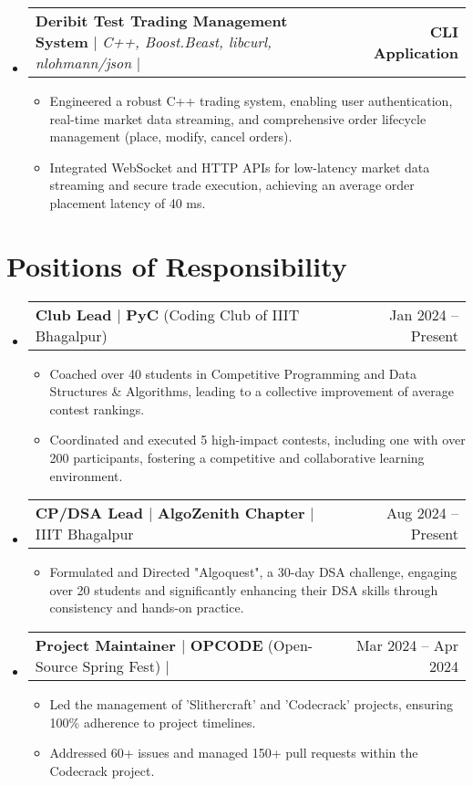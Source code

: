 \documentclass[letterpaper,11pt]{article}
\makeatletter
\newcommand{\resumePOR}[3]{
\vspace{0.5mm}\item
    \begin{tabular*}{0.97\textwidth}[t]{l@{\extracolsep{\fill}}r}
        \textbf{#1}\hspace{0.3mm}#2 & \small{#3} 
    \end{tabular*}
    \vspace{-3mm}
}
\newcommand{\resumeProjectHeading}[2]{
    \item
    \begin{tabular*}{1.001\textwidth}{l@{\extracolsep{\fill}}r}
      \small#1 & \textbf{\small #2}\\
    \end{tabular*}\vspace{-7pt}
}
\newcommand{\resumeSubHeadingListStart}{\begin{itemize}[leftmargin=0.0in, label={}]}
\newcommand{\resumeSubHeadingListEnd}{\end{itemize}}
\newcommand{\resumeItemListStart}{\begin{itemize}}
\newcommand{\resumeItemListEnd}{\end{itemize}\vspace{-15pt}}
\makeatother
\begin{document}
    \vspace{-8pt}
    \resumeSubHeadingListStart
    \resumeProjectHeading
      {\textbf{\large Deribit Test Trading Management System} $|$ \emph{C++, Boost.Beast, libcurl, nlohmann/json} $|$ \emph{\color{Blue} \href{https://github.com/sanghaibiraj/DeribitTest_TradeManagementSystem}\faGithub{}}}{CLI Application}
      \vspace{-16pt}
      \resumeItemListStart
        \item Engineered a robust C++ trading system, enabling user authentication, real-time market data streaming, and comprehensive order lifecycle management (place, modify, cancel orders). 
        \vspace{-4pt}
        \item Integrated WebSocket and HTTP APIs for low-latency market data streaming and secure trade execution, achieving an average order placement latency of 40 ms.
      \resumeItemListEnd
    \vspace{-10pt}
\resumeSubHeadingListEnd

\vspace{8pt}

\section{\textbf{Positions of Responsibility}}
\resumeSubHeadingListStart
\resumePOR{Club Lead $|$ }{\textbf{PyC }(Coding Club of IIIT Bhagalpur)}{Jan 2024 -- Present}
    \resumeItemListStart
        \item Coached over 40 students in Competitive Programming and Data Structures \& Algorithms, leading to a collective improvement of average contest rankings.
        \vspace{-4pt}
        \item Coordinated and executed 5 high-impact contests, including one with over 200 participants, fostering a competitive and collaborative learning environment.
    \resumeItemListEnd
\vspace{4pt}
\resumePOR{CP/DSA Lead $|$ }{\textbf{AlgoZenith Chapter} $|$ IIIT Bhagalpur}{Aug 2024 -- Present}
    \resumeItemListStart
        \item Formulated and Directed "Algoquest", a 30-day DSA challenge, engaging over 20 students and significantly enhancing their DSA skills through consistency and hands-on practice.
    \resumeItemListEnd
\vspace{4pt}
\resumePOR{Project Maintainer $|$ }{\textbf{OPCODE} (Open-Source Spring Fest) $|$ \color{Blue} \href{https://drive.google.com/file/d/1bFdeC9lv0cpDgV0IQ5HacyyKJtViQ6rH/view?usp=sharing}\faAward{} }{Mar 2024 -- Apr 2024}
    \resumeItemListStart
        \item Led the management of 'Slithercraft' and 'Codecrack' projects, ensuring 100\% adherence to project timelines.
        \vspace{-4pt}
        \item Addressed 60+ issues and managed 150+ pull requests within the Codecrack project.
    \resumeItemListEnd
\resumeSubHeadingListEnd
\end{document}
